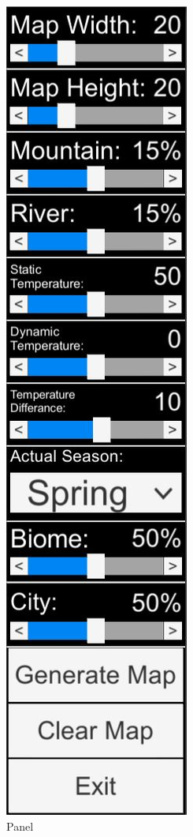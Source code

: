 \begin{figure}[h!]
\centering
\includegraphics[scale=0.6]{kepek/Panel.JPG}
\caption{Panel}
\label{fig:Panel}
\end{figure}

